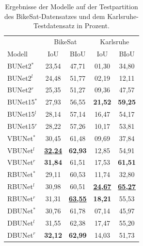\begin{table}[ht]
	\centering
	\begin{tabular}{l|cc|cc}
        & \multicolumn{2}{c|}{BikeSat} & \multicolumn{2}{c}{Karlsruhe} \\
		Modell & \ac{IoU} & \ac{BIoU} & \ac{IoU} & \ac{BIoU} \\
		\midrule
        BUNet2$^*$ & 23,54 & 47,71 & 01,30 & 34,80 \\ 
        BUNet2$^l$ & 24,48 & 51,77 & 02,19 & 12,11 \\ 
        BUNet2$^r$ & 25,35 & 51,27 & 09,36 & 47,57 \\ 
		\midrule

        BUNet15$^*$ & 27,93 & 56,55 & \textbf{21,52} & \textbf{59,25} \\ 
        BUNet15$^l$ & 28,14 & 57,14 & 16,47 & 54,17 \\ 
        BUNet15$^r$ & 28,22 & 57,26 & 10,17 & 53,81 \\ 
		\midrule

        VBUNet$^*$ & 30,45 & 61,48 & 09,69 & 37,84 \\ 
        VBUNet$^l$ & \underline{\textbf{32,24}} & \textbf{62,93} & 12,85 & 54,91 \\ 
        VBUNet$^r$ & \textbf{31,84} & 61,51 & 17,53 & \textbf{61,51} \\ 
		\midrule

        RBUNet$^*$ & 29,11 & 60,53 & 11,74 & 32,80 \\ 
        RBUNet$^l$ & 30,98 & 60,51 & \underline{\textbf{24,67}} & \underline{\textbf{65,27}} \\ 
        RBUNet$^r$ & 31,31 & \underline{\textbf{63,55}} & \textbf{18,21} & 55,53 \\ 
		\midrule

        DBUNet$^*$ & 30,76 & 61,78 & 07,14 & 45,97 \\ 
        DBUNet$^l$ & 31,55 & 62,38 & 17,47 & 55,20 \\ 
        DBUNet$^r$ & \textbf{32,12} & \textbf{62,99} & 14,03 & 51,73 \\ 
        
	\end{tabular}
	\caption{Ergebnisse der Modelle auf der Testpartition des BikeSat-Datensatzes und dem Karlsruhe-Testdatensatz 
    in Prozent.}
	\label{tab:results}
\end{table}


